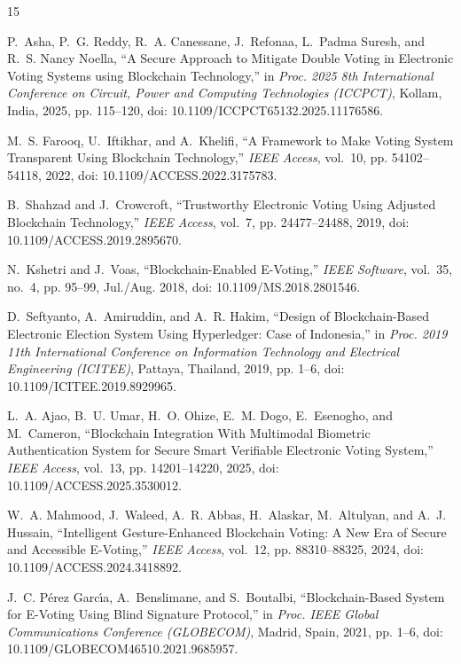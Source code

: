 \documentclass[12pt,a4paper]{report}
\begin{document}
\begin{thebibliography}{15}
\setlength{\itemsep}{2pt}
\setlength{\parskip}{0pt}

P.~Asha, P.~G. Reddy, R.~A. Canessane, J.~Refonaa, L.~Padma Suresh, and R.~S. Nancy Noella, ``A Secure Approach to Mitigate Double Voting in Electronic Voting Systems using Blockchain Technology,'' in \emph{Proc. 2025 8th International Conference on Circuit, Power and Computing Technologies (ICCPCT)}, Kollam, India, 2025, pp. 115--120, doi: 10.1109/ICCPCT65132.2025.11176586.

M.~S. Farooq, U.~Iftikhar, and A.~Khelifi, ``A Framework to Make Voting System Transparent Using Blockchain Technology,'' \emph{IEEE Access}, vol.~10, pp. 54102--54118, 2022, doi: 10.1109/ACCESS.2022.3175783.

B.~Shahzad and J.~Crowcroft, ``Trustworthy Electronic Voting Using Adjusted Blockchain Technology,'' \emph{IEEE Access}, vol.~7, pp. 24477--24488, 2019, doi: 10.1109/ACCESS.2019.2895670.

N.~Kshetri and J.~Voas, ``Blockchain-Enabled E-Voting,'' \emph{IEEE Software}, vol.~35, no.~4, pp. 95--99, Jul./Aug. 2018, doi: 10.1109/MS.2018.2801546.

D.~Seftyanto, A.~Amiruddin, and A.~R. Hakim, ``Design of Blockchain-Based Electronic Election System Using Hyperledger: Case of Indonesia,'' in \emph{Proc. 2019 11th International Conference on Information Technology and Electrical Engineering (ICITEE)}, Pattaya, Thailand, 2019, pp. 1--6, doi: 10.1109/ICITEE.2019.8929965.

L.~A. Ajao, B.~U. Umar, H.~O. Ohize, E.~M. Dogo, E.~Esenogho, and M.~Cameron, ``Blockchain Integration With Multimodal Biometric Authentication System for Secure Smart Verifiable Electronic Voting System,'' \emph{IEEE Access}, vol.~13, pp. 14201--14220, 2025, doi: 10.1109/ACCESS.2025.3530012.

W.~A. Mahmood, J.~Waleed, A.~R. Abbas, H.~Alaskar, M.~Altulyan, and A.~J. Hussain, ``Intelligent Gesture-Enhanced Blockchain Voting: A New Era of Secure and Accessible E-Voting,'' \emph{IEEE Access}, vol.~12, pp. 88310--88325, 2024, doi: 10.1109/ACCESS.2024.3418892.

J.~C. P{\'e}rez Garc{\'\i}a, A.~Benslimane, and S.~Boutalbi, ``Blockchain-Based System for E-Voting Using Blind Signature Protocol,'' in \emph{Proc. IEEE Global Communications Conference (GLOBECOM)}, Madrid, Spain, 2021, pp. 1--6, doi: 10.1109/GLOBECOM46510.2021.9685957.


\end{thebibliography}
\end{document}
